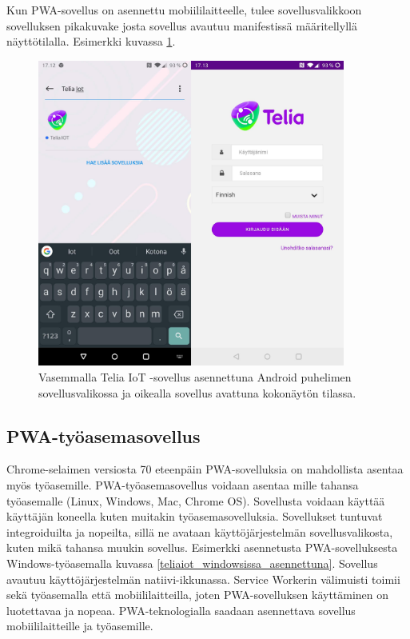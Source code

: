 \documentclass{tktltiki}
\begin{document}
Kun PWA-sovellus on asennettu mobiililaitteelle, tulee sovellusvalikkoon sovelluksen pikakuvake josta sovellus avautuu manifestissä määritellyllä näyttötilalla. Esimerkki kuvassa \ref{teliaiot_puhelimessa_asennettuna}.

\begin{figure}[h]
  \centering
    \includegraphics[width=0.9\textwidth]{teliaiot_puhelimessa.jpg}
      \caption{Vasemmalla Telia IoT -sovellus asennettuna Android puhelimen sovellusvalikossa ja oikealla sovellus avattuna kokonäytön tilassa.}
      \label{teliaiot_puhelimessa_asennettuna}
\end{figure}

\clearpage

\subsection{PWA-työasemasovellus} 

Chrome-selaimen versiosta 70 eteenpäin PWA-sovelluksia on mahdollista asentaa myös työasemille. PWA-työasemasovellus voidaan asentaa mille tahansa työasemalle (Linux, Windows, Mac, Chrome OS). Sovellusta voidaan käyttää käyttäjän koneella kuten muitakin työasemasovelluksia. Sovellukset tuntuvat integroiduilta ja nopeilta, sillä ne avataan käyttöjärjestelmän sovellusvalikosta, kuten mikä tahansa muukin sovellus. Esimerkki asennetusta PWA-sovelluksesta Windows-työasemalla kuvassa \ref{teliaiot_windowsissa_asennettuna}. Sovellus avautuu käyttöjärjestelmän natiivi-ikkunassa. Service Workerin välimuisti toimii sekä työasemalla että mobiililaitteilla, joten PWA-sovelluksen käyttäminen on luotettavaa ja nopeaa. PWA-teknologialla saadaan asennettava sovellus mobiililaitteille ja työasemille.
\end{document}
